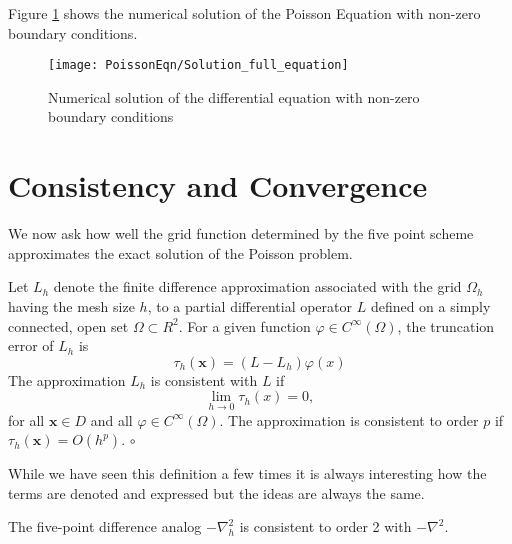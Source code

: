 Figure \ref{SolPoss} shows the numerical solution of the Poisson Equation with non-zero boundary conditions.
\begin{figure}[H]
  \caption{Numerical solution of the differential equation with non-zero boundary conditions }\label{SolPoss}
  \centering
    \texttt{[image: PoissonEqn/Solution\_full\_equation]}
\end{figure}

\section{Consistency and Convergence}
We now ask how well the grid function determined by the five point scheme approximates
the exact solution of the Poisson problem.
\begin{definition}
Let $L_h$ denote the finite difference approximation associated with the grid $\Omega_h$ having the mesh size $h$, to a partial differential operator $L$ defined on
a simply connected, open set $\Omega \subset R^2$. For a given function $\varphi\in C^{\infty}(\Omega)$,
the truncation error of $L_h$ is
\[\tau_{h}(\mathbf{x})=(L-L_h)\varphi(x) \]
The approximation $L_h$ is consistent with $L$ if
\[ \lim_{h\rightarrow 0}\tau_h(x)=0,\]
for all $\mathbf{x} \in D$ and all $\varphi \in C^{\infty}(\Omega)$. The approximation is consistent to order $p$ if $\tau_h(\mathbf{x})=O(h^p)$.
$\circ$
\end{definition}
While we have seen this definition a few times it is always interesting how the
terms are denoted and expressed but the ideas are always the same.
\begin{proposition}
The five-point difference analog $-\nabla^2_h$ is consistent to order 2 with $-\nabla^2$.
\end{proposition}
